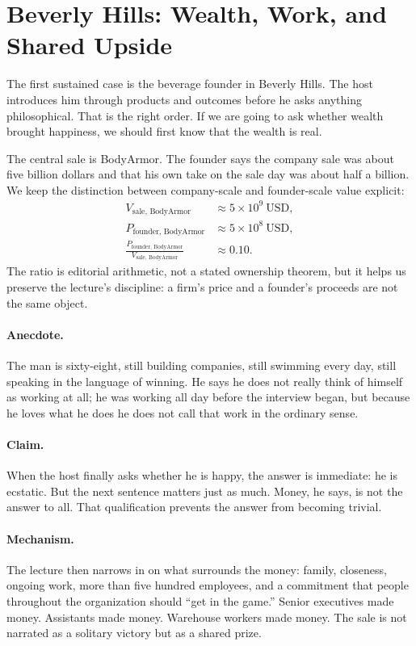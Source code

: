 \section{Beverly Hills: Wealth, Work, and Shared Upside}

The first sustained case is the beverage founder in Beverly Hills. The host introduces him through products and outcomes before he asks anything philosophical. That is the right order. If we are going to ask whether wealth brought happiness, we should first know that the wealth is real.

The central sale is BodyArmor. The founder says the company sale was about five billion dollars and that his own take on the sale day was about half a billion. We keep the distinction between company-scale and founder-scale value explicit:
\begin{align}
V_{\text{sale, BodyArmor}} &\approx 5 \times 10^{9}\ \mathrm{USD},\\
P_{\text{founder, BodyArmor}} &\approx 5 \times 10^{8}\ \mathrm{USD},\\
\frac{P_{\text{founder, BodyArmor}}}{V_{\text{sale, BodyArmor}}} &\approx 0.10.
\end{align}
The ratio is editorial arithmetic, not a stated ownership theorem, but it helps us preserve the lecture's discipline: a firm's price and a founder's proceeds are not the same object.

\paragraph{Anecdote.} The man is sixty-eight, still building companies, still swimming every day, still speaking in the language of winning. He says he does not really think of himself as working at all; he was working all day before the interview began, but because he loves what he does he does not call that work in the ordinary sense.

\paragraph{Claim.} When the host finally asks whether he is happy, the answer is immediate: he is ecstatic. But the next sentence matters just as much. Money, he says, is not the answer to all. That qualification prevents the answer from becoming trivial.

\paragraph{Mechanism.} The lecture then narrows in on what surrounds the money: family, closeness, ongoing work, more than five hundred employees, and a commitment that people throughout the organization should ``get in the game.'' Senior executives made money. Assistants made money. Warehouse workers made money. The sale is not narrated as a solitary victory but as a shared prize.

